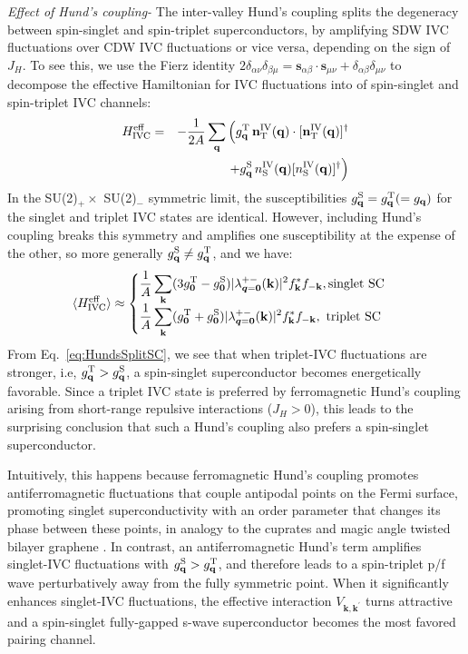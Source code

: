 \documentclass[aps,pra,twocolumn,superscriptaddress,10pt,article,nofootinbib,showpacs,longbibliography]{revtex4-1}
\def \k{{\mathbf k}}
\def \n{{\mathbf n}}
\def \q{{\mathbf q}}
\def \s{{\mathbf s}}
\def \beq{\begin{eqnarray}}
\def \eeq{\end{eqnarray}}
\def \nn{\nonumber \\}
\begin{document}
\emph{Effect of Hund's coupling-}
The inter-valley Hund's coupling splits the degeneracy between spin-singlet and spin-triplet superconductors, by amplifying SDW IVC fluctuations over CDW IVC fluctuations or vice versa, depending on the sign of $J_H$.
To see this, we use the Fierz identity $2 \delta_{\alpha \nu} \delta_{\beta \mu } = \s_{\alpha \beta} \cdot \s_{\mu \nu } + \delta_{\alpha \beta} \delta_{\mu \nu}$ to 
decompose the effective Hamiltonian for IVC fluctuations into of spin-singlet and spin-triplet IVC channels:
\beq
H^{\rm eff}_{\rm IVC} &=& - \frac{1}{2A} \sum_\q \Big( g^{\rm T}_\q \, \n^{\rm IV}_{\rm T}(\q) \cdot [\n^{\rm IV}_{\rm T}(\q)]^\dagger \nn && ~~~~~~~~~~~~ + g^{\rm S}_\q \, n^{\rm IV}_{\rm S}(\q) [n^{\rm IV}_{\rm S}(\q)]^\dagger \Big)
\label{eq:HIVC_TvS}
\eeq
In the SU(2)$_+ \times$ SU(2)$_-$ symmetric limit, the susceptibilities $g^{\rm S}_\q= g^{\rm T}_\q (= g_\q)$ for the singlet and triplet IVC states are identical.
However, including Hund's coupling breaks this symmetry and amplifies one susceptibility at the expense of the other, so more generally $g^{\rm S}_\q \neq g^{\rm T}_\q$, and we have:
\beq
\langle H^{\rm eff}_{\rm IVC} \rangle \approx \begin{cases} \displaystyle \frac{1}{A} \sum_{\k} (3g^{\rm T}_{\bm 0} - g^{\rm S}_{\bm 0})|\lambda^{+-}_{\bm q = \bm{0}}(\k)|^2 f^*_\k f_{-\k}, \text{singlet SC} \\ \displaystyle \frac{1}{A} \sum_{\k} (g^{\rm T}_{\bm 0} + g^{\rm S}_{\bm 0}) |\lambda^{+-}_{\bm q = \bm{0} }(\k)|^2 f^*_\k f_{-\k}, \text{ triplet SC} \end{cases}
\label{eq:HundsSplitSC} \nn
\eeq
From Eq.~\eqref{eq:HundsSplitSC}, we see that when triplet-IVC fluctuations are stronger, i.e, $g^{\rm T}_\q > g^{\rm S}_\q$, a spin-singlet superconductor becomes energetically favorable. 
Since a triplet IVC state is preferred by ferromagnetic Hund's coupling arising from short-range repulsive interactions ($J_H>0$), this leads to the surprising conclusion that such a Hund's coupling also prefers a spin-singlet superconductor.

Intuitively, this happens because ferromagnetic Hund's coupling promotes antiferromagnetic fluctuations that couple antipodal points on the Fermi surface, promoting singlet superconductivity with an order parameter that changes its phase between these points, in analogy to the cuprates \cite{Scalapino95} and magic angle twisted bilayer graphene \cite{YV2019,Isobe2018}.
In contrast, an antiferromagnetic Hund's term amplifies singlet-IVC fluctuations with $g^{\rm S}_\q > g^{\rm T}_\q$, and therefore leads to a spin-triplet p/f wave perturbatively away from the fully symmetric point. 
When it significantly enhances singlet-IVC fluctuations, the effective interaction $V_{\k,\k^\prime}$ turns attractive and a spin-singlet fully-gapped s-wave superconductor becomes the most favored pairing channel.
\end{document}
